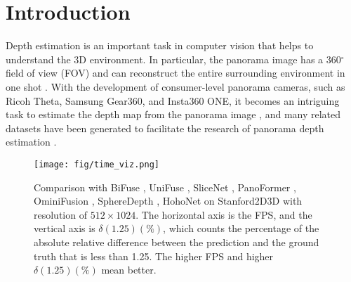 \section{Introduction}
\label{sec:intro}

Depth estimation is an important task in computer vision that helps to understand the 3D environment. In particular, the panorama image has a 360$^\circ$ field of view (FOV) and can reconstruct the entire surrounding environment in one shot \cite{zioulis2018omnidepth,wang2020bifuse}. With the development of consumer-level panorama cameras, such as Ricoh Theta, Samsung Gear360, and Insta360 ONE, it becomes an intriguing task to estimate the depth map from the panorama image \cite{pintore2021slicenet,sun2021hohonet,yan2022spheredepth,shen2022panoformer,li2022omnifusion}, and many related datasets have been generated to facilitate the research of panorama depth estimation \cite{zioulis2018omnidepth,armeni2017joint,chang2017matterport3d,zheng2020structured3d,albanis2021pano3d}.

\begin{figure}
	\begin{center}
		\texttt{[image: fig/time\_viz.png]}
	\end{center}

    \vspace{-1.5em}
 
	\caption{
        Comparison with BiFuse \cite{wang2020bifuse}, UniFuse \cite{jiang2021unifuse}, SliceNet \cite{pintore2021slicenet}, PanoFormer \cite{shen2022panoformer}, OminiFusion \cite{li2022omnifusion}, SphereDepth \cite{yan2022spheredepth}, HohoNet \cite{sun2021hohonet} on Stanford2D3D \cite{armeni2017joint} with resolution of $512 \times 1024$. The horizontal axis is the FPS, and the vertical axis is $ \delta(1.25) (\%)$, which counts the percentage of the absolute relative difference between the prediction and the ground truth that is less than 1.25. The higher FPS and higher $ \delta(1.25) (\%)$ mean better.
	}
	\label{fig:time_viz}

    \vspace{-2.0em}
 
\end{figure}

